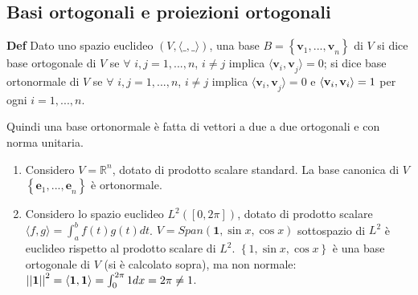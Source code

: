 \documentclass{article}
\begin{document}
\subsection{Basi ortogonali e proiezioni ortogonali}

\textbf{Def} Dato uno spazio euclideo $\left( V,\langle \_,\_\mathbf{\rangle 
}\right) $, una base $B=\left\{ \mathbf{v}_{1}\mathbf{,...,v}_{n}\right\} $
di $V$ si dice base ortogonale di $V$ se $\forall $ $i,j=1,...,n$, $i\neq j$
implica $\langle \mathbf{v}_{i}\mathbf{,v}_{j}\mathbf{\rangle }=0$; si dice
base ortonormale di $V$ se $\forall $ $i,j=1,...,n$, $i\neq j$ implica $%
\langle \mathbf{v}_{i}\mathbf{,v}_{j}\mathbf{\rangle }=0$ e $\langle \mathbf{%
v}_{i},\mathbf{v}_{i}\mathbf{\rangle }=1$ per ogni $i=1,...,n$.

Quindi una base ortonormale \`{e} fatta di vettori a due a due ortogonali e
con norma unitaria.

\begin{enumerate}
\item Considero $V=%
\mathbb{R}
^{n}$, dotato di prodotto scalare standard. La base canonica di $V$ $\left\{ 
\mathbf{e}_{1}\mathbf{,...,e}_{n}\right\} $ \`{e} ortonormale.

\item Considero lo spazio euclideo $L^{2}\left( \left[ 0,2\pi \right]
\right) $, dotato di prodotto scalare $\langle f,g\mathbf{\rangle =}%
\int_{a}^{b}f\left( t\right) g\left( t\right) dt$. $V=Span\left( \mathbf{1}%
,\sin x,\cos x\right) $ sottospazio di $L^{2}$ \`{e} euclideo rispetto al
prodotto scalare di $L^{2}$. $\left\{ 1,\sin x,\cos x\right\} $ \`{e} una
base ortogonale di $V$ (si \`{e} calcolato sopra), ma non normale: $%
\left\vert \left\vert \mathbf{1}\right\vert \right\vert ^{2}=\langle \mathbf{%
1,1\rangle }=\int_{0}^{2\pi }1dx=2\pi \neq 1$.
\end{enumerate}
\end{document}
